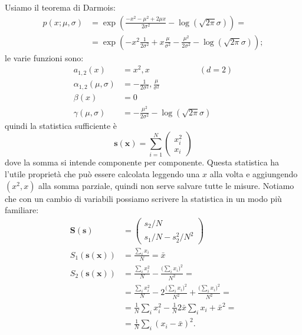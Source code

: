 \begin{solution}
	Usiamo il teorema di Darmois:
	\begin{align*}
		p(x;\mu,\sigma)
		&= \exp \left( \frac{-x^2-\mu^2+2\mu x}{2\sigma^2} - \log(\sqrt{2\pi}\sigma) \right) = \\
		&= \exp \left( -x^2\frac1{2\sigma^2}
		+ x\frac\mu{\sigma^2}
		-\frac{\mu^2}{2\sigma^2} - \log(\sqrt{2\pi}\sigma) \right);
	\end{align*}
	le varie funzioni sono:
	\begin{align*}
		a_{1,2}(x) &= x^2, x \hspace{6em} (d=2)\\
		\alpha_{1,2}(\mu,\sigma) &= -\frac1{2\sigma^2}, \frac\mu{\sigma^2} \\
		\beta(x) &= 0 \\
		\gamma(\mu,\sigma) &= -\frac{\mu^2}{2\sigma^2} - \log(\sqrt{2\pi}\sigma)
	\end{align*}
	quindi la statistica sufficiente è
	\begin{equation*}
		\mathbf s(\mathbf x) = \sum_{i=1}^N \begin{pmatrix} x_i^2 \\ x_i \end{pmatrix}
	\end{equation*}
	dove la somma si intende componente per componente.
	Questa statistica ha l'utile proprietà che può essere calcolata leggendo una $x$ alla volta e aggiungendo $(x^2,x)$ alla somma parziale, quindi non serve salvare tutte le misure.
	Notiamo che con un cambio di variabili possiamo scrivere la statistica in un modo più familiare:
	\begin{align*}
		\mathbf S(\mathbf s)
		&= \begin{pmatrix}
			s_2 / N \\
			s_1 / N - s_2^2 / N^2
		\end{pmatrix} \\
		S_1(\mathbf s(\mathbf x)) 
		&= \frac{\sum_ix_i}N = \bar x \\
		S_2(\mathbf s(\mathbf x))
		&= \frac{\sum_ix_i^2}N - \frac{\big(\sum_ix_i\big)^2}{N^2} = \\
		&= \frac{\sum_ix_i^2}N - 2\frac{\big(\sum_ix_i\big)^2}{N^2} + \frac{\big(\sum_ix_i\big)^2}{N^2} = \\
		&= \frac1N\sum_ix_i^2 - \frac1N2\bar x\sum_ix_i + \bar x^2 = \\
		&= \frac1N\sum_i(x_i-\bar x)^2.
	\end{align*}
\end{solution}

